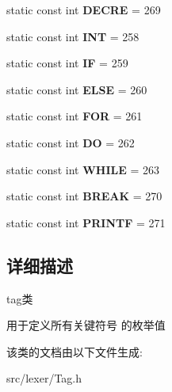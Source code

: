 \begin{DoxyCompactItemize}
static const int {\bfseries D\+E\+C\+RE} = 269
\item 
\mbox{\label{class_tag_a38242d609491f491ef9484f1679e7c3d}} 
static const int {\bfseries I\+NT} = 258
\item 
\mbox{\label{class_tag_a92a30db62631be16cad518d2bf59efaa}} 
static const int {\bfseries IF} = 259
\item 
\mbox{\label{class_tag_a4149b756bf94ef2d83f0d1de23ddee10}} 
static const int {\bfseries E\+L\+SE} = 260
\item 
\mbox{\label{class_tag_ac2ba80666f85af3bd539107c7121b16d}} 
static const int {\bfseries F\+OR} = 261
\item 
\mbox{\label{class_tag_a489769ae22c0fcf7c7842206a998abf8}} 
static const int {\bfseries DO} = 262
\item 
\mbox{\label{class_tag_a1ca35b43b49867c19d892103016b09b3}} 
static const int {\bfseries W\+H\+I\+LE} = 263
\item 
\mbox{\label{class_tag_a125fe413cdcec181606fa122a40f0026}} 
static const int {\bfseries B\+R\+E\+AK} = 270
\item 
\mbox{\label{class_tag_a85ff0086e29d3d6a8f6c78695df0bd52}} 
static const int {\bfseries P\+R\+I\+N\+TF} = 271
\end{DoxyCompactItemize}


\subsection{详细描述}
tag类 

用于定义所有关键符号 的枚举值 

该类的文档由以下文件生成\+:\begin{DoxyCompactItemize}
\item 
src/lexer/Tag.\+h\end{DoxyCompactItemize}

